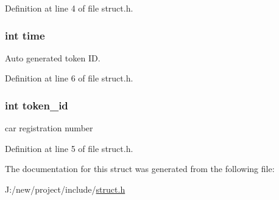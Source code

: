 Definition at line 4 of file struct.\-h.

\hypertarget{structentry__system_a42715f65f02da52edc5b22021d8ae670}{
\subsubsection[{time}]{\setlength{\rightskip}{0pt plus 5cm}int {\bf time}}}\label{structentry__system_a42715f65f02da52edc5b22021d8ae670}


Auto generated token I\-D. 



Definition at line 6 of file struct.\-h.

\hypertarget{structentry__system_ac10e2e2d66be333d039b75217892053d}{
\subsubsection[{token\-\_\-id}]{\setlength{\rightskip}{0pt plus 5cm}int {\bf token\-\_\-id}}}\label{structentry__system_ac10e2e2d66be333d039b75217892053d}


car registration number 



Definition at line 5 of file struct.\-h.



The documentation for this struct was generated from the following file\-:\begin{DoxyCompactItemize}
\item 
J\-:/new/project/include/\hyperlink{struct_8h}{struct.\-h}\end{DoxyCompactItemize}
